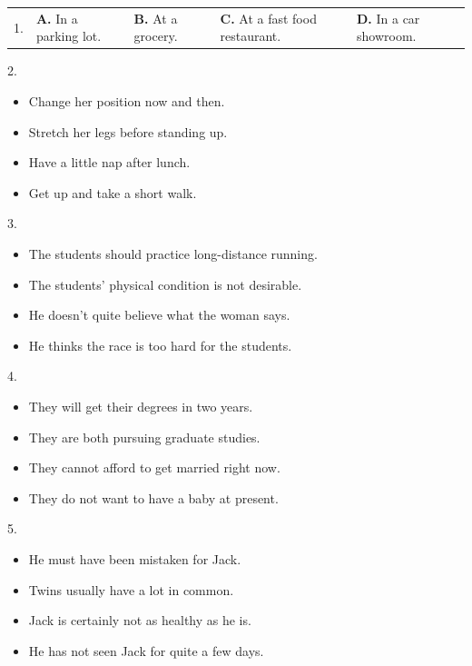 \documentclass[UTF8,11pt]{ctexart}
\begin{document}
\noindent\begin{tabularx}{\linewidth}{@{}lXXXX@{}}1. & \textbf{A.} In a parking lot. & \textbf{B.} At a grocery. & \textbf{C.} At a fast food restaurant. & \textbf{D.} In a car showroom.\\\end{tabularx}\par

2.


\begin{itemize}[leftmargin=2em,itemsep=.2em,topsep=.4em]\item[A.] Change her position now and then.
\item[B.] Stretch her legs before standing up.
\item[C.] Have a little nap after lunch.
\item[D.] Get up and take a short walk.
\end{itemize}

3.


\begin{itemize}[leftmargin=2em,itemsep=.2em,topsep=.4em]\item[A.] The students should practice long-distance running.
\item[B.] The students’ physical condition is not desirable.
\item[C.] He doesn’t quite believe what the woman says.
\item[D.] He thinks the race is too hard for the students.
\end{itemize}

4.


\begin{itemize}[leftmargin=2em,itemsep=.2em,topsep=.4em]\item[A.] They will get their degrees in two years.
\item[B.] They are both pursuing graduate studies.
\item[C.] They cannot afford to get married right now.
\item[D.] They do not want to have a baby at present.
\end{itemize}

5.


\begin{itemize}[leftmargin=2em,itemsep=.2em,topsep=.4em]\item[A.] He must have been mistaken for Jack.
\item[B.] Twins usually have a lot in common.
\item[C.] Jack is certainly not as healthy as he is.
\item[D.] He has not seen Jack for quite a few days.
\end{itemize}
\end{document}
